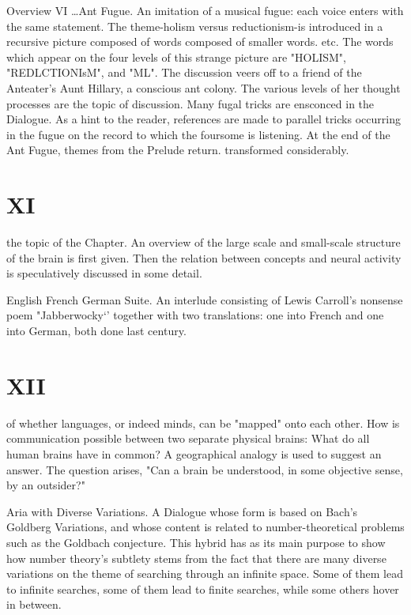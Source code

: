 Overview                                                                                      VI …Ant Fugue. An imitation of a musical fugue: each voice enters with the same statement. The theme-holism versus reductionism-is introduced in a recursive picture composed of words composed of smaller words. etc. The words which appear on the four levels of this strange picture are "HOLISM", "REDLCTIONIsM", and "ML". The discussion veers off to a friend of the Anteater's Aunt Hillary, a conscious ant colony. The various levels of her thought processes are the topic of discussion. Many fugal tricks are ensconced in the Dialogue. As a hint to the reader, references are made to parallel tricks occurring in the fugue on the record to which the foursome is listening. At the end of the Ant Fugue, themes from the Prelude return. transformed considerably. 


\chapter {XI}
the topic of the Chapter. An overview of the large scale and small-scale structure of the brain is first given. Then the relation between concepts and neural activity is speculatively discussed in some detail. 

English French German Suite. An interlude consisting of Lewis Carroll's nonsense poem "Jabberwocky`' together with two translations: one into French and one into German, both done last century. 


\chapter {XII}
of whether languages, or indeed minds, can be "mapped" onto each other. How is communication possible between two separate physical brains: What do all human brains have in common? A geographical analogy is used to suggest an answer. The question arises, "Can a brain be understood, in some objective sense, by an outsider?" 

Aria with Diverse Variations. A Dialogue whose form is based on Bach's Goldberg Variations, and whose content is related to number-theoretical problems such as the Goldbach conjecture. This hybrid has as its main purpose to show how number theory's subtlety stems from the fact that there are many diverse variations on the theme of searching through an infinite space. Some of them lead to infinite searches, some of them lead to finite searches, while some others hover in between. 


